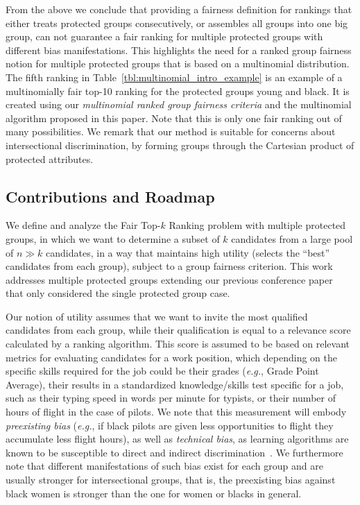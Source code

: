 From the above we conclude that providing a fairness definition for rankings that either treats protected groups consecutively, or assembles all groups into one big group, can not guarantee a fair ranking for multiple protected groups with different bias manifestations. 
%
This highlights the need for a ranked group fairness notion for multiple protected groups that is based on a multinomial distribution.
%
The fifth ranking in Table~\ref{tbl:multinomial_intro_example} is an example of a multinomially fair top-10 ranking for the protected groups young and black.
%
It is created using our \textit{multinomial ranked group fairness criteria} and the multinomial \algoFAIR algorithm proposed in this paper.
%
Note that this is only one fair ranking out of many possibilities.
%
We remark that our method is suitable for concerns about intersectional discrimination, by forming groups through the Cartesian product of protected attributes.

\subsection{Contributions and Roadmap}
We define and analyze the {\sc Fair Top-$k$ Ranking problem} with multiple protected groups, in which we want to determine a subset of $k$ candidates from a large pool of $n \gg k$ candidates, in a way that maintains high utility (selects the ``best'' candidates from each group), subject to a group fairness criterion. 
%
This work addresses multiple protected groups extending our previous conference paper~\cite{zehlike2017fair} that only considered the single protected group case.
%
%

Our notion of utility assumes that we want to invite the most qualified candidates from each group, while their qualification is equal to a relevance score calculated by a ranking algorithm.
%
This score is assumed to be based on relevant metrics for evaluating candidates for a work position, which depending on the specific skills required for the job could be their grades ({\em e.g.}, Grade Point Average), their results in a standardized knowledge/skills test specific for a job, such as their typing speed in words per minute for typists, or their number of hours of flight in the case of pilots.
%
We note that this measurement will embody \emph{preexisting bias} ({\em e.g.}, if black pilots are given less opportunities to flight they accumulate less flight hours), as well as \emph{technical bias}, as learning algorithms are known to be susceptible to direct and indirect discrimination~\cite{tuto2016,HajianFerrer12}.
%
We furthermore note that different manifestations of such bias exist for each group and are usually stronger for intersectional groups, that is, the preexisting bias against black women is stronger than the one for women or blacks in general.
%

